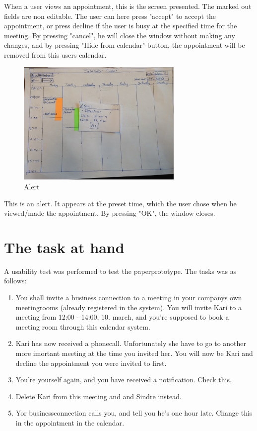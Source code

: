 \documentclass{article}
\begin{document}
When a user views an appointment, this is the screen presented. The marked out fields are non editable. The user can here press "accept" to accept the appointment, or press decline if the user is busy at the specified time for the meeting. By pressing "cancel", he will close the window without making any changes, and by pressing "Hide from calendar"-button, the appointment will be removed from this users calendar.

\newpage

\begin{figure}[h!] 
    \begin{center} 
        \includegraphics[width=8cm]{img/IMG_5611.JPG}
        \caption{Alert}
    \label{nalert}
    \end{center}
\end{figure}

This is an alert. It appears at the preset time, which the user chose when he viewed/made the appointment. By pressing "OK", the window closes.

\newpage



\section{The task at hand}
A usability test was performed to test the paperprototype. The tasks was as follows:
\begin{enumerate}

\item You shall invite a business connection to a meeting in your companys own meetingrooms (already registered in the system). You will invite Kari to a meeting from 12:00 - 14:00, 10. march, and you're supposed to book a meeting room through this calendar system.

\item Kari has now received a phonecall. Unfortunately she have to go to another more imortant meeting at the time you invited her. You will now be Kari and decline the appointment you were invited to first.

\item You're yourself again, and you have received a notification. Check this.

\item Delete Kari from this meeting and and Sindre instead.

\item Yor businessconnection calls you, and tell you he's one hour late. Change this in the appointment in the calendar.
\end{enumerate}
\end{document}

